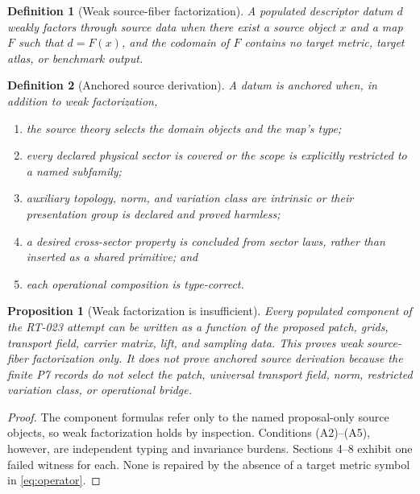 \documentclass[11pt]{article}
\newtheorem{definition}{Definition}
\newtheorem{proposition}{Proposition}
\begin{document}
\begin{definition}[Weak source-fiber factorization]
A populated descriptor datum \(d\) weakly factors through source data when
there exist a source object \(x\) and a map \(F\) such that \(d=F(x)\), and
the codomain of \(F\) contains no target metric, target atlas, or benchmark
output.
\end{definition}

\begin{definition}[Anchored source derivation]
A datum is anchored when, in addition to weak factorization,
\begin{enumerate}[label=(A\arabic*),leftmargin=2.5em]
  \item the source theory selects the domain objects and the map's type;
  \item every declared physical sector is covered or the scope is explicitly
        restricted to a named subfamily;
  \item auxiliary topology, norm, and variation class are intrinsic or their
        presentation group is declared and proved harmless;
  \item a desired cross-sector property is concluded from sector laws, rather
        than inserted as a shared primitive; and
  \item each operational composition is type-correct.
\end{enumerate}
\end{definition}

\begin{proposition}[Weak factorization is insufficient]
Every populated component of the RT-023 attempt can be written as a function
of the proposed patch, grids, transport field, carrier matrix, lift, and
sampling data.  This proves weak source-fiber factorization only.  It does not
prove anchored source derivation because the finite P7 records do not select
the patch, universal transport field, norm, restricted variation class, or
operational bridge.
\end{proposition}

\begin{proof}
The component formulas refer only to the named proposal-only source objects,
so weak factorization holds by inspection.  Conditions (A2)--(A5), however,
are independent typing and invariance burdens.  Sections 4--8 exhibit one
failed witness for each.  None is repaired by the absence of a target metric
symbol in \eqref{eq:operator}.
\end{proof}
\end{document}
